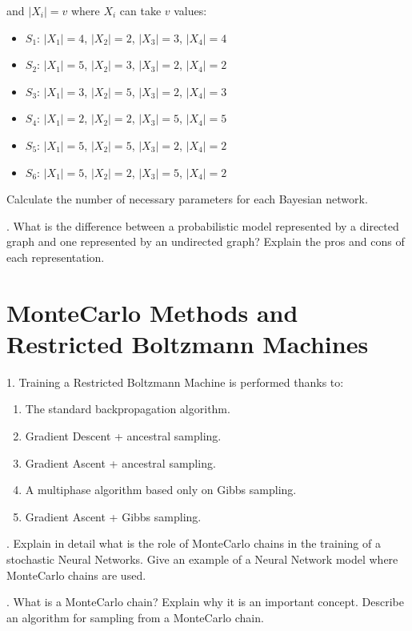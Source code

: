 \noindent and $|{X_i}| = v$ where $X_i$ can take $v$ values:

\begin{itemize}
    \item $S_1$: $|X_1| = 4$, $|X_2| = 2$, $|X_3| = 3$, $|X_4| = 4$
    \item $S_2$: $|X_1| = 5$, $|X_2| = 3$, $|X_3| = 2$, $|X_4| = 2$
    \item $S_3$: $|X_1| = 3$, $|X_2| = 5$, $|X_3| = 2$, $|X_4| = 3$
    \item $S_4$: $|X_1| = 2$, $|X_2| = 2$, $|X_3| = 5$, $|X_4| = 5$
    \item $S_5$: $|X_1| = 5$, $|X_2| = 5$, $|X_3| = 2$, $|X_4| = 2$
    \item $S_6$: $|X_1| = 5$, $|X_2| = 2$, $|X_3| = 5$, $|X_4| = 2$
\end{itemize}

\noindent Calculate the number of necessary parameters for each Bayesian network.


. What is the difference between a probabilistic model represented by a directed graph and one represented by an undirected graph? Explain the pros and cons of each representation.

\section{ MonteCarlo Methods and Restricted Boltzmann Machines}

1. Training a Restricted Boltzmann Machine is performed thanks to:

\begin{enumerate}[label=\roman*]
    \item The standard backpropagation algorithm.
    \item Gradient Descent + ancestral sampling.
    \item Gradient Ascent + ancestral sampling.
    \item A multiphase algorithm based only on Gibbs sampling.
    \item Gradient Ascent + Gibbs sampling.
\end{enumerate}


. Explain in detail what is the role of MonteCarlo chains in the training of a stochastic Neural Networks. Give an example of a Neural Network model where MonteCarlo chains are used.

. What is a MonteCarlo chain? Explain why it is an important concept. Describe an algorithm for sampling from a MonteCarlo chain.


